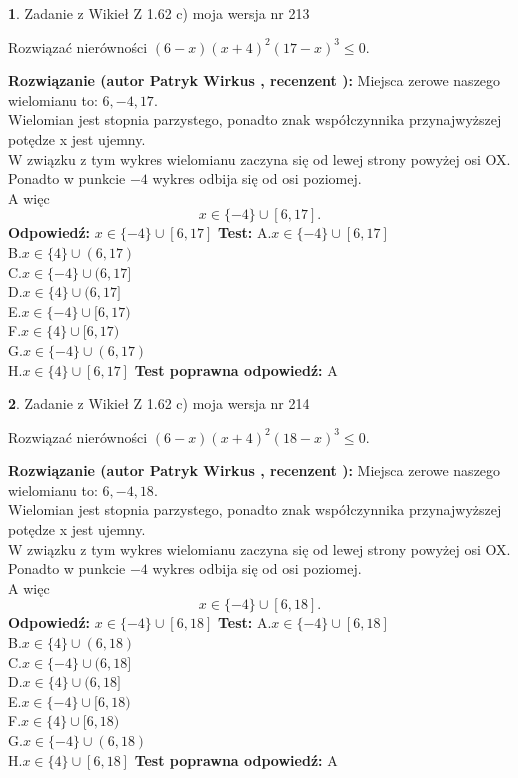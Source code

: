 \documentclass[12pt, a4paper]{article}
\theoremstyle{definition} %
\newtheorem{zad}{}
\newcommand{\zadStart}[1]{\begin{zad}#1\newline}
\newcommand{\zadStop}{\end{zad}}
\newcommand{\rozwStart}[2]{\noindent \textbf{Rozwiązanie (autor #1 , recenzent #2): }\newline}
\newcommand{\rozwStop}{\newline}
\newcommand{\odpStart}{\noindent \textbf{Odpowiedź:}\newline}
\newcommand{\odpStop}{\newline}
\newcommand{\testStart}{\noindent \textbf{Test:}\newline}
\newcommand{\testStop}{\newline}
\newcommand{\kluczStart}{\noindent \textbf{Test poprawna odpowiedź:}\newline}
\newcommand{\kluczStop}{\newline}
\begin{document}
\zadStart{Zadanie z Wikieł Z 1.62 c) moja wersja nr 213}

Rozwiązać nierówności $(6-x)(x+4)^{2}(17-x)^{3}\le0$.
\zadStop
\rozwStart{Patryk Wirkus}{}
Miejsca zerowe naszego wielomianu to: $6, -4, 17$.\\
Wielomian jest stopnia parzystego, ponadto znak współczynnika przy\linebreak najwyższej potędze x jest ujemny.\\ W związku z tym wykres wielomianu zaczyna się od lewej strony powyżej osi OX.\\
Ponadto w punkcie $-4$ wykres odbija się od osi poziomej.\\
A więc $$x \in \{-4\} \cup [6,17].$$
\rozwStop
\odpStart
$x \in \{-4\} \cup [6,17]$
\odpStop
\testStart
A.$x \in \{-4\} \cup [6,17]$\\
B.$x \in \{4\} \cup (6,17)$\\
C.$x \in \{-4\} \cup (6,17]$\\
D.$x \in \{4\} \cup (6,17]$\\
E.$x \in \{-4\} \cup [6,17)$\\
F.$x \in \{4\} \cup [6,17)$\\
G.$x \in \{-4\} \cup (6,17)$\\
H.$x \in \{4\} \cup [6,17]$
\testStop
\kluczStart
A
\kluczStop



\zadStart{Zadanie z Wikieł Z 1.62 c) moja wersja nr 214}

Rozwiązać nierówności $(6-x)(x+4)^{2}(18-x)^{3}\le0$.
\zadStop
\rozwStart{Patryk Wirkus}{}
Miejsca zerowe naszego wielomianu to: $6, -4, 18$.\\
Wielomian jest stopnia parzystego, ponadto znak współczynnika przy\linebreak najwyższej potędze x jest ujemny.\\ W związku z tym wykres wielomianu zaczyna się od lewej strony powyżej osi OX.\\
Ponadto w punkcie $-4$ wykres odbija się od osi poziomej.\\
A więc $$x \in \{-4\} \cup [6,18].$$
\rozwStop
\odpStart
$x \in \{-4\} \cup [6,18]$
\odpStop
\testStart
A.$x \in \{-4\} \cup [6,18]$\\
B.$x \in \{4\} \cup (6,18)$\\
C.$x \in \{-4\} \cup (6,18]$\\
D.$x \in \{4\} \cup (6,18]$\\
E.$x \in \{-4\} \cup [6,18)$\\
F.$x \in \{4\} \cup [6,18)$\\
G.$x \in \{-4\} \cup (6,18)$\\
H.$x \in \{4\} \cup [6,18]$
\testStop
\kluczStart
A
\kluczStop
\end{document}
